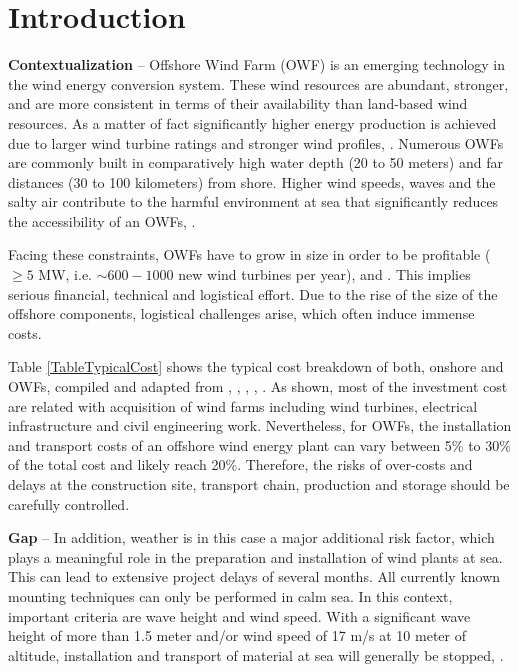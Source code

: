 \section{Introduction}
\label{Sec-Introduction}
\textbf{Contextualization} --
Offshore Wind Farm (OWF) is an emerging technology in the wind energy conversion system. These wind resources are abundant, stronger, and are more consistent in terms of their availability than land-based wind resources. As a matter of fact significantly higher energy production is achieved due to larger wind turbine ratings and stronger wind profiles, \cite{Sun2012298}. Numerous OWFs are commonly built in comparatively high water depth (20 to 50 meters) and far distances (30 to 100 kilometers) from shore. Higher wind speeds, waves and the salty air contribute to the harmful environment at sea that significantly reduces the accessibility of an OWFs, \cite{Smit2007}.

Facing these constraints, OWFs have to grow in size in order to be profitable ($\geq 5$ MW, i.e. $\sim600-1000$ new wind turbines per year), \cite{EWEA2011} and \cite{Kaldellis2013}. This implies serious financial, technical and logistical effort. Due to the rise of the size of the offshore components, logistical challenges arise, which often induce immense costs.

Table \ref{TableTypicalCost} shows the typical cost breakdown of both, onshore and OWFs, compiled and adapted from \cite{Henderson2003}, \cite{Junginger2004}, \cite{UK10}, \cite{TCE12}, \cite{IRENA12}. As shown, most of the investment cost are related with acquisition of wind farms including wind turbines, electrical infrastructure and civil engineering work. Nevertheless, for OWFs, the installation and transport costs of an offshore wind energy plant can vary between 5\% to 30\% of the total cost and likely reach 20\%. Therefore, the risks of over-costs and delays at the construction site, transport chain, production and storage should be carefully controlled.

\textbf{Gap} --
In addition, weather is in this case a major additional risk factor, which plays a meaningful role in the preparation and installation of wind plants at sea. This can lead to extensive project delays of several months. All currently known mounting techniques can only be performed in calm sea. In this context, important criteria are wave height and wind speed. With a significant wave height of more than 1.5 meter and/or wind speed of 17 m/s at 10 meter of altitude, installation and transport of material at sea will generally be stopped, \cite{aitsimulation}.

